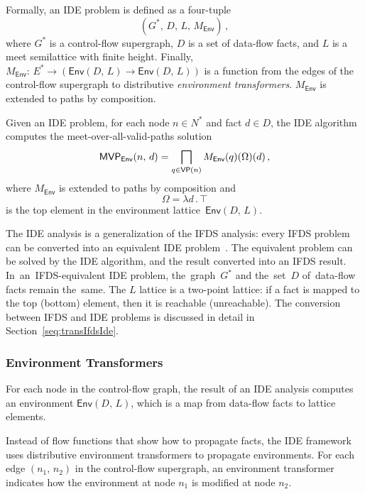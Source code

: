 Formally, an IDE problem is defined as a four-tuple
\begin{equation}
  (G^*,\,D,\,L,\,M_\textsf{Env})\,,
\end{equation}
where $G^*$ is a control-flow supergraph, $D$ is a set of data-flow facts, and $L$ is a meet semilattice
with finite height. 
Finally, $M_\textsf{Env}:\,E^*\to(\textsf{Env}(D,\,L)\to \textsf{Env}(D,\,L))$ is a function from the edges of the control-flow supergraph to distributive \textit{environment transformers}. $M_\textsf{Env}$ is extended to paths by composition.

Given an IDE problem, for each node $n\in N^*$ and fact $d\in D$, the IDE algorithm computes the meet-over-all-valid-paths solution
\begin{equation}\label{eq:mvpdef}
  \textsf{MVP}_{\textsf{Env}}(n,\,d)=\bigsqcap_{q\in\textsf{VP}(n)}M_\textsf{Env}(q)(\Omega)(d)\,,
\end{equation}
where $M_\textsf{Env}$ is extended to paths by composition and
\begin{equation}
  \Omega=\lambda d\,.\,\top
\end{equation}
is the top element in the environment lattice~$\mathsf{Env}(D,\,L)$.

The IDE analysis is a generalization of the IFDS analysis: every IFDS problem can be converted into an equivalent IDE problem~\cite{reps1995precise}. The equivalent problem can be solved by the IDE algorithm, and the result converted into an IFDS result. In~an~IFDS-equivalent IDE problem, the~graph~$G^*$ and the~set~$D$ of~data-flow facts remain the~same. The $L$ lattice is a two-point lattice: if a fact is mapped to the top (bottom) element, then it is reachable (unreachable). The conversion between IFDS and IDE problems is discussed in detail in Section~\ref{seq:transIfdsIde}.

\subsubsection{Environment Transformers}
For each node in the control-flow graph, the result of an IDE analysis computes an environment $\textsf{Env}(D,\,L)$, which is a map from data-flow facts to lattice elements.

Instead of flow functions that show how to propagate facts, the IDE framework uses distributive environment transformers to propagate environments. For each edge $(n_1,\,n_2)$ in the control-flow supergraph, an environment transformer indicates how the environment at node $n_1$ is modified at node $n_2$.

